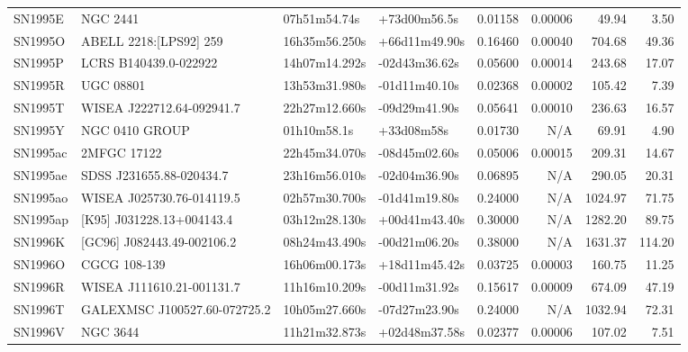 \begin{longtable}{llllrrrr}
SN1995E          &                        NGC 2441 &    07h51m54.74s &    +73d00m56.5s &  0.01158 &  0.00006 &    49.94 &        3.50 \\
SN1995O          &          ABELL 2218:[LPS92] 259 &   16h35m56.250s &   +66d11m49.90s &  0.16460 &  0.00040 &   704.68 &       49.36 \\
SN1995P          &           LCRS B140439.0-022922 &   14h07m14.292s &   -02d43m36.62s &  0.05600 &  0.00014 &   243.68 &       17.07 \\
SN1995R          &                       UGC 08801 &   13h53m31.980s &   -01d11m40.10s &  0.02368 &  0.00002 &   105.42 &        7.39 \\
SN1995T          &       WISEA J222712.64-092941.7 &   22h27m12.660s &   -09d29m41.90s &  0.05641 &  0.00010 &   236.63 &       16.57 \\
SN1995Y          &                  NGC 0410 GROUP &     01h10m58.1s &      +33d08m58s &  0.01730 &      N/A &    69.91 &        4.90 \\
SN1995ac         &                     2MFGC 17122 &   22h45m34.070s &   -08d45m02.60s &  0.05006 &  0.00015 &   209.31 &       14.67 \\
SN1995ae         &        SDSS J231655.88-020434.7 &   23h16m56.010s &   -02d04m36.90s &  0.06895 &      N/A &   290.05 &       20.31 \\
SN1995ao         &       WISEA J025730.76-014119.5 &   02h57m30.700s &   -01d41m19.80s &  0.24000 &      N/A &  1024.97 &       71.75 \\
SN1995ap         &       [K95] J031228.13+004143.4 &   03h12m28.130s &   +00d41m43.40s &  0.30000 &      N/A &  1282.20 &       89.75 \\
SN1996K          &      [GC96] J082443.49-002106.2 &   08h24m43.490s &   -00d21m06.20s &  0.38000 &      N/A &  1631.37 &      114.20 \\
SN1996O          &                    CGCG 108-139 &   16h06m00.173s &   +18d11m45.42s &  0.03725 &  0.00003 &   160.75 &       11.25 \\
SN1996R          &       WISEA J111610.21-001131.7 &   11h16m10.209s &   -00d11m31.92s &  0.15617 &  0.00009 &   674.09 &       47.19 \\
SN1996T          &  GALEXMSC J100527.60-072725.2   &   10h05m27.660s &   -07d27m23.90s &  0.24000 &      N/A &  1032.94 &       72.31 \\
SN1996V          &                        NGC 3644 &   11h21m32.873s &   +02d48m37.58s &  0.02377 &  0.00006 &   107.02 &        7.51 \\

\end{longtable}
